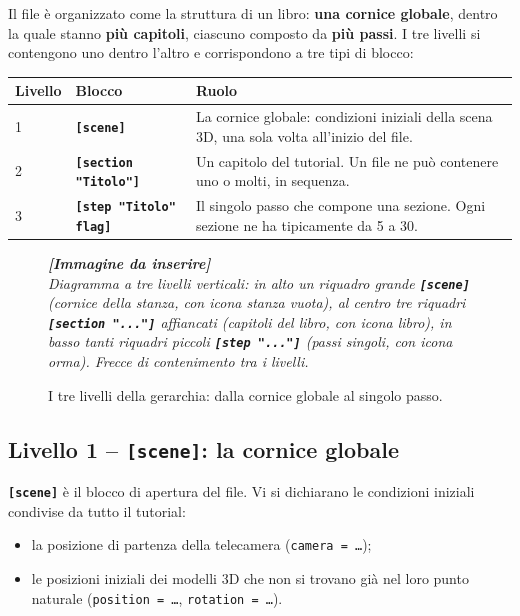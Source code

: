 ﻿\documentclass[a4paper,12pt,oneside]{book}
\newcommand{\kw}[1]{\texttt{\color{keycolor}#1}}
\newcommand{\sez}[1]{\texttt{\color{sectioncolor}\textbf{#1}}}
\newcommand{\imgph}[2]{%
  \begin{tcolorbox}[colback=cvtlightblue!30,colframe=cvtblue!40,%
    width=#1,halign=center,valign=center,height=5cm,boxrule=0.5pt,arc=3pt]%
    \textcolor{cvtgray}{\itshape\footnotesize\textbf{[Immagine da inserire]}\\[3pt]#2}%
  \end{tcolorbox}}
\begin{document}
Il file è organizzato come la struttura di un libro: \textbf{una cornice
globale}, dentro la quale stanno \textbf{più capitoli}, ciascuno composto da
\textbf{più passi}. I tre livelli si contengono uno dentro l'altro e
corrispondono a tre tipi di blocco:

\begin{longtable}{@{}p{2.4cm}p{3.6cm}p{8cm}@{}}
\toprule
\textbf{Livello} & \textbf{Blocco} & \textbf{Ruolo} \\
\midrule
1 & \sez{[scene]} & La cornice globale: condizioni iniziali della scena 3D, una sola volta all'inizio del file. \\
2 & \sez{[section "Titolo"]} & Un capitolo del tutorial. Un file ne può contenere uno o molti, in sequenza. \\
3 & \sez{[step "Titolo" flag]} & Il singolo passo che compone una sezione. Ogni sezione ne ha tipicamente da 5 a 30. \\
\bottomrule
\end{longtable}

\begin{figure}[H]
  \centering
  \imgph{12cm}{Diagramma a tre livelli verticali: in alto un riquadro grande \sez{[scene]} (cornice della stanza, con icona stanza vuota), al centro tre riquadri \sez{[section "..."]} affiancati (capitoli del libro, con icona libro), in basso tanti riquadri piccoli \sez{[step "..."]} (passi singoli, con icona orma). Frecce di contenimento tra i livelli.}
  \caption{I tre livelli della gerarchia: dalla cornice globale al singolo passo.}
  \label{fig:gerarchia-blocchi}
\end{figure}

\subsection{Livello 1 -- \texttt{[scene]}: la cornice globale}

\sez{[scene]} è il blocco di apertura del file. Vi si dichiarano le condizioni
iniziali condivise da tutto il tutorial:

\begin{itemize}
  \item la posizione di partenza della telecamera (\kw{camera = \ldots});
  \item le posizioni iniziali dei modelli 3D che non si trovano già nel
        loro punto naturale (\kw{position = \ldots}, \kw{rotation = \ldots}).
\end{itemize}
\end{document}
